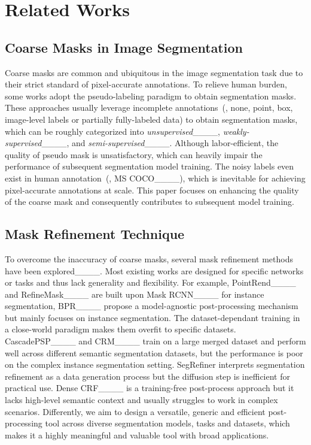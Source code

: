 \section{Related Works}
\subsection{Coarse Masks in Image Segmentation}
Coarse masks are common and ubiquitous in the image segmentation task due to their strict standard of pixel-accurate annotations. To relieve human burden, some works adopt the pseudo-labeling paradigm to obtain segmentation masks. These approaches usually leverage incomplete annotations~(\eg, none, point, box, image-level labels or partially fully-labeled data) to obtain segmentation masks, which can be roughly categorized into \textit{unsupervised}____, \textit{weakly-supervised}____, and \textit{semi-supervised}____. Although labor-efficient, the quality of pseudo mask is unsatisfactory, which can heavily impair the performance of subsequent segmentation model training. The noisy labels even exist in human annotation~(\eg, MS COCO____), which is inevitable for achieving pixel-accurate annotations at scale. This paper focuses on enhancing the quality of the coarse mask and consequently contributes to subsequent model training.

\subsection{Mask Refinement Technique}
To overcome the inaccuracy of coarse masks, several mask refinement methods have been explored____. Most existing works are designed for specific networks or tasks and thus lack generality and flexibility. For example, PointRend____ and RefineMask____ are built upon Mask RCNN____ for instance segmentation, BPR____ propose a model-agnostic post-processing mechanism but mainly focuses on instance segmentation. 
The dataset-dependant training in a close-world paradigm makes them overfit to specific datasets.
CascadePSP____ and CRM____ train on a large merged dataset and perform well across different semantic segmentation datasets, but the performance is poor on the complex instance segmentation setting. %
SegRefiner interprets segmentation refinement as a data generation process but the diffusion step is inefficient for practical use. 
Dense CRF____ is a training-free post-process approach but it lacks high-level semantic context and usually struggles to work in complex scenarios.
Differently, we aim to design a versatile, generic and efficient post-processing tool across diverse segmentation models, tasks and datasets, which makes it a highly meaningful and valuable tool with broad applications.

